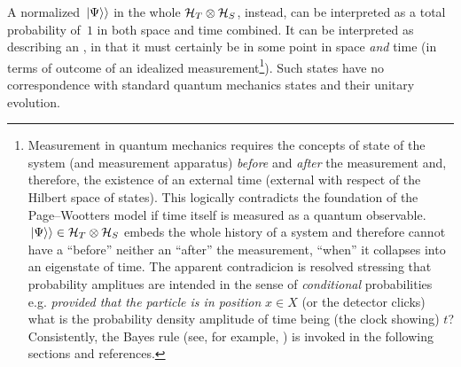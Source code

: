 A normalized $\left.\left| \Psi \right\rangle\right\rangle$ in the whole $\mathcal{H}_T \otimes \mathcal{H}_S$,
instead,
can be interpreted as a total probability of~$1$ in both space and time combined.
It can be interpreted as describing an ,
in that it
must certainly be in some point in space
\emph{and} time (in terms of outcome of an idealized measurement\footnote{
  Measurement in quantum mechanics requires the concepts
  of state of the system
  (and measurement apparatus)
  \emph{before} and \emph{after} the measurement and, therefore, the existence
  of an external time (external with respect of the Hilbert space of states).
  This logically contradicts the foundation of the Page--Wootters model if
  time itself is measured as a quantum observable. $\left.\left| \Psi \right\rangle\right\rangle \in \mathcal{H}_T \otimes \mathcal{H}_S$
  embeds the whole history of a system and therefore cannot have a
  ``before'' neither an ``after'' the measurement, ``when'' it collapses
  into an eigenstate of time. The apparent contradicion is resolved
  stressing that probability amplitues are intended in the sense of
  \emph{conditional} probabilities e.g. \emph{provided that the particle
  is in position} $x \in X$ (or the detector clicks)
  what is the probability density amplitude of time being (the clock showing) $t$?
  Consistently, the Bayes rule
  (see, for example, \cite{Stat:Conditional})
  is invoked in the following sections
  and references.
}).
Such states have no correspondence with standard quantum mechanics states and their unitary evolution.